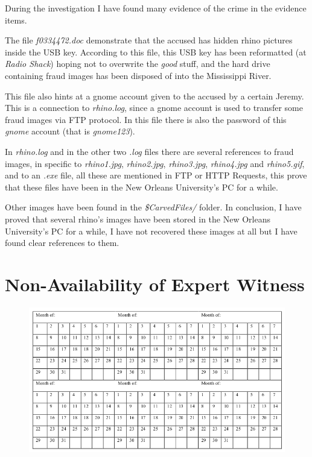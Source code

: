 \documentclass{article}
\begin{document}
During the investigation I have found many evidence of the crime in the evidence items.

The file \textit{f0334472.doc} demonstrate that the accused has hidden rhino pictures inside the USB key. According to this file, this USB key has been reformatted (at \textit{Radio Shack}) hoping not to overwrite the \textit{good} stuff, and the hard drive containing fraud images has been disposed of into the Mississippi River.

This file also hints at a gnome account given to the accused by a certain Jeremy.
This is a connection to \textit{rhino.log}, since a gnome account is used to transfer some fraud images via FTP protocol.
In this file there is also the password of this \textit{gnome} account (that is \textit{gnome123}).

In \textit{rhino.log} and in the other two \textit{.log} files there are several references to fraud images, in specific to \textit{rhino1.jpg}, \textit{rhino2.jpg}, \textit{rhino3.jpg}, \textit{rhino4.jpg} and \textit{rhino5.gif}, and to an \textit{.exe} file, all these are mentioned in FTP or HTTP Requests, this prove that these files have been in the New Orleans University's PC for a while.

Other images have been found in the \textit{\$CarvedFiles/} folder.
In conclusion, I have proved that several rhino's images have been stored in the New Orleans University's PC for a while, I have not recovered these images at all but I have found clear references to them.

\section{Non-Availability of Expert Witness}

\begin{figure}[h]
	\includegraphics[width=\textwidth]{img/calendar.png}
\end{figure}
\end{document}
